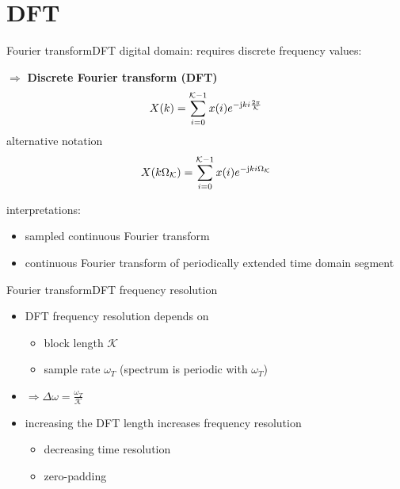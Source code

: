 \section{DFT}
	\begin{frame}{Fourier transform}{DFT}
		digital domain: requires discrete frequency values:
		
		$\Rightarrow$ \textbf{Discrete Fourier transform (DFT)}
		\begin{equation*}
			X(k) = \sum\limits_{i=0}^{\mathcal{K}-1}{x(i){e}^{-\mathrm{j}ki\frac{2\pi}{\mathcal{K}}}}
		\end{equation*}
        \pause
        alternative notation
		\begin{equation*}
			X(k\Omega_\mathcal{K}) = \sum\limits_{i=0}^{\mathcal{K}-1}{x(i){e}^{-\mathrm{j}ki\Omega_\mathcal{K}}}
		\end{equation*}
		
		\pause
         interpretations:
		\begin{itemize}
			\item	sampled continuous Fourier transform
			\item	continuous Fourier transform of periodically extended time domain segment
		\end{itemize}
	\end{frame}	

	\begin{frame}{Fourier transform}{DFT frequency resolution}
        \begin{itemize}
            \item   DFT frequency resolution depends on 
                \begin{itemize}
                    \item   block length $\mathcal{K}$
                    \item   sample rate $\omega_T$ (spectrum is periodic with $\omega_T$)
                \end{itemize}
            \pause
            \item   $\Rightarrow \Delta\omega = \frac{\omega_T}{\mathcal{K}}$
            \pause
            \bigskip
            \item   increasing the DFT length increases frequency resolution
                \begin{itemize}
                    \item   decreasing time resolution
                    \item   zero-padding
                \end{itemize}
        \end{itemize}
	\end{frame}	

